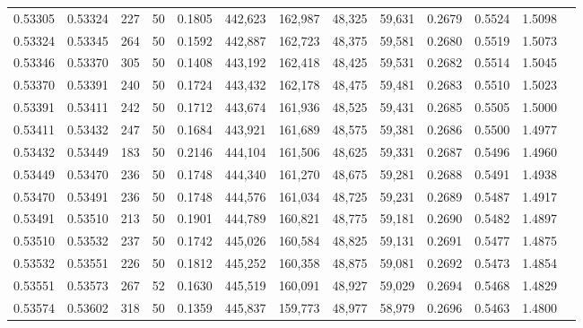 \begin{tabular}{rrrrrrrrrrrrr}
0.53305 & 0.53324 &   227 &  50 &                                     0.1805 & 442,623 & 162,987 &  48,325 &  59,631 & 0.2679 & 0.5524 & 1.5098 \\
0.53324 & 0.53345 &   264 &  50 &                                     0.1592 & 442,887 & 162,723 &  48,375 &  59,581 & 0.2680 & 0.5519 & 1.5073 \\
0.53346 & 0.53370 &   305 &  50 &                                     0.1408 & 443,192 & 162,418 &  48,425 &  59,531 & 0.2682 & 0.5514 & 1.5045 \\
0.53370 & 0.53391 &   240 &  50 &                                     0.1724 & 443,432 & 162,178 &  48,475 &  59,481 & 0.2683 & 0.5510 & 1.5023 \\
0.53391 & 0.53411 &   242 &  50 &                                     0.1712 & 443,674 & 161,936 &  48,525 &  59,431 & 0.2685 & 0.5505 & 1.5000 \\
0.53411 & 0.53432 &   247 &  50 &                                     0.1684 & 443,921 & 161,689 &  48,575 &  59,381 & 0.2686 & 0.5500 & 1.4977 \\
0.53432 & 0.53449 &   183 &  50 &                                     0.2146 & 444,104 & 161,506 &  48,625 &  59,331 & 0.2687 & 0.5496 & 1.4960 \\
0.53449 & 0.53470 &   236 &  50 &                                     0.1748 & 444,340 & 161,270 &  48,675 &  59,281 & 0.2688 & 0.5491 & 1.4938 \\
0.53470 & 0.53491 &   236 &  50 &                                     0.1748 & 444,576 & 161,034 &  48,725 &  59,231 & 0.2689 & 0.5487 & 1.4917 \\
0.53491 & 0.53510 &   213 &  50 &                                     0.1901 & 444,789 & 160,821 &  48,775 &  59,181 & 0.2690 & 0.5482 & 1.4897 \\
0.53510 & 0.53532 &   237 &  50 &                                     0.1742 & 445,026 & 160,584 &  48,825 &  59,131 & 0.2691 & 0.5477 & 1.4875 \\
0.53532 & 0.53551 &   226 &  50 &                                     0.1812 & 445,252 & 160,358 &  48,875 &  59,081 & 0.2692 & 0.5473 & 1.4854 \\
0.53551 & 0.53573 &   267 &  52 &                                     0.1630 & 445,519 & 160,091 &  48,927 &  59,029 & 0.2694 & 0.5468 & 1.4829 \\
0.53574 & 0.53602 &   318 &  50 &                                     0.1359 & 445,837 & 159,773 &  48,977 &  58,979 & 0.2696 & 0.5463 & 1.4800 \\

\end{tabular}
